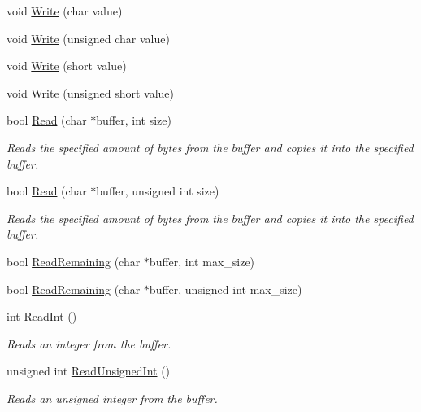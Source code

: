 \begin{DoxyCompactItemize}
void \hyperlink{class_senergy_1_1_byte_buffer_add80584faab29bcadcb437b45ad97a87}{Write} (char value)
\item 
void \hyperlink{class_senergy_1_1_byte_buffer_a061fe3c4158ba940e68bf4545639561e}{Write} (unsigned char value)
\item 
void \hyperlink{class_senergy_1_1_byte_buffer_ae0e9d53b9afa8b098eed7b517a60b938}{Write} (short value)
\item 
void \hyperlink{class_senergy_1_1_byte_buffer_a9286d05c71ce66859098778f11be9c51}{Write} (unsigned short value)
\item 
bool \hyperlink{class_senergy_1_1_byte_buffer_ae4e73e6e193bec7b9f7df0919d1641d9}{Read} (char $\ast$buffer, int size)
\begin{DoxyCompactList}\small\item\em Reads the specified amount of bytes from the buffer and copies it into the specified buffer. \end{DoxyCompactList}\item 
bool \hyperlink{class_senergy_1_1_byte_buffer_ace3d04d38706d534a16e596ee291630b}{Read} (char $\ast$buffer, unsigned int size)
\begin{DoxyCompactList}\small\item\em Reads the specified amount of bytes from the buffer and copies it into the specified buffer. \end{DoxyCompactList}\item 
bool \hyperlink{class_senergy_1_1_byte_buffer_a391deafd9b6e3c4b4c2b92fe78358ebf}{Read\-Remaining} (char $\ast$buffer, int max\-\_\-size)
\item 
bool \hyperlink{class_senergy_1_1_byte_buffer_a8e9ec7a8d6c26c01a738768928fff704}{Read\-Remaining} (char $\ast$buffer, unsigned int max\-\_\-size)
\item 
int \hyperlink{class_senergy_1_1_byte_buffer_ab15f04d43dd82cebf6dc25254d210e4e}{Read\-Int} ()
\begin{DoxyCompactList}\small\item\em Reads an integer from the buffer. \end{DoxyCompactList}\item 
unsigned int \hyperlink{class_senergy_1_1_byte_buffer_a7abe5475b2a9adcad384d3125640aba2}{Read\-Unsigned\-Int} ()
\begin{DoxyCompactList}\small\item\em Reads an unsigned integer from the buffer. \end{DoxyCompactList}\item 

\end{DoxyCompactItemize}
